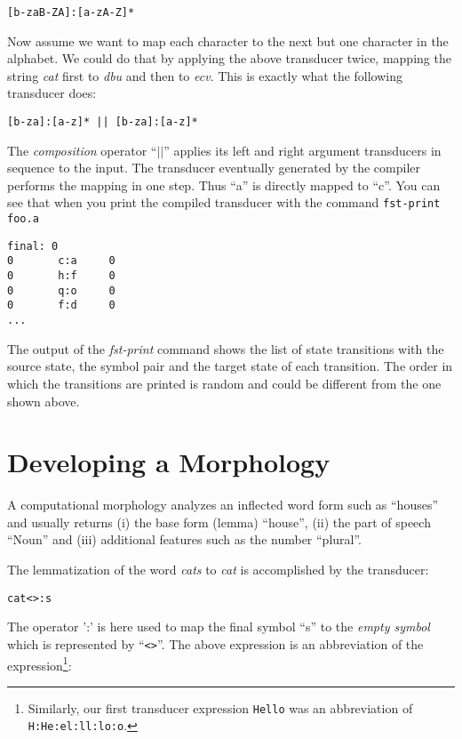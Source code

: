 \documentclass[11pt]{article}
\begin{document}
\begin{verbatim}
[b-zaB-ZA]:[a-zA-Z]*
\end{verbatim}

Now assume we want to map each character to the next but one character
in the alphabet. We could do that by applying the above transducer
twice, mapping the string \emph{cat} first to \emph{dbu} and then to
\emph{ecv}. This is exactly what the following transducer does:

\begin{verbatim}
[b-za]:[a-z]* || [b-za]:[a-z]*
\end{verbatim}

The \emph{composition} operator ``$||$'' applies its left and right
argument transducers in sequence to the input. The transducer
eventually generated by the compiler performs the mapping in one
step. Thus ``a'' is directly mapped to ``c''. You can see that when
you print the compiled transducer with the command
\verb#fst-print foo.a#

\begin{verbatim}
final: 0
0       c:a     0
0       h:f     0
0       q:o     0
0       f:d     0
...
\end{verbatim}

The output of the \emph{fst-print} command shows the list of state
transitions with the source state, the symbol pair and the target
state of each transition. The order in which the transitions are
printed is random and could be different from the one shown above.


\section{Developing a Morphology\label{morphology}}

A computational morphology analyzes an inflected word form such as
``houses'' and usually returns (i) the base form (lemma) ``house'',
(ii) the part of speech ``Noun'' and (iii) additional features such as
the number ``plural''.

The lemmatization of the word \emph{cats} to \emph{cat} is
accomplished by the transducer:

\begin{verbatim}
cat<>:s
\end{verbatim}

The operator ':' is here used to map the final symbol ``s'' to the
\emph{empty symbol} which is represented by ``\verb#<>#''. The above
expression is an abbreviation of the expression\footnote{Similarly,
  our first transducer expression \texttt{Hello} was an abbreviation
  of \texttt{H:He:el:ll:lo:o}.}:
\end{document}
